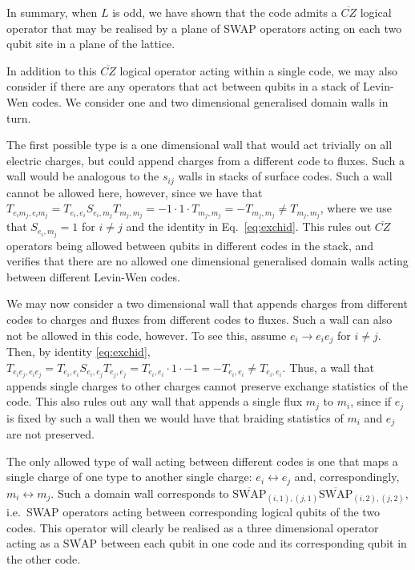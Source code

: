 \documentclass[pra,twocolumn,a4paper,nofootinbib]{revtex4-1}
\begin{document}
In summary, when $L$ is odd, we have shown that the code admits a $\overline{CZ}$ logical operator that may be realised by a plane of SWAP operators acting on each two qubit site in a plane of the lattice. 

In addition to this $\overline{CZ}$ logical operator acting within a single code, we may also consider if there are any operators that act between qubits in a stack of Levin-Wen codes. We consider one and two dimensional generalised domain walls in turn.

The first possible type is a one dimensional wall that would act trivially on all electric charges, but could append charges from a different code to fluxes. Such a wall would be analogous to the $s_{ij}$ walls in stacks of surface codes. Such a wall cannot be allowed here, however, since we have that $T_{e_im_j,e_im_j}= T_{e_i,e_i}S_{e_i,m_j}T_{m_j,m_j}=-1 \cdot 1 \cdot T_{m_j,m_j}=-T_{m_j,m_j} \neq T_{m_j,m_j}$, where we use that $S_{e_i,m_j}=1$ for $i\neq j$ and the identity in Eq.~\ref{eq:exchid}. This rules out $\overline{CZ}$ operators being allowed between qubits in different codes in the stack, and verifies that there are no allowed one dimensional generalised domain walls acting between different Levin-Wen codes.

We may now consider a two dimensional wall that appends charges from different codes to charges and fluxes from different codes to fluxes. Such a wall can also not be allowed in this code, however. To see this, assume $e_i \to e_ie_j$ for $i \neq j$. Then, by identity \ref{eq:exchid}, $T_{e_ie_j,e_ie_j}=T_{e_i,e_i}S_{e_i,e_j}T_{e_j,e_j}=T_{e_i,e_i} \cdot 1 \cdot -1=-T_{e_i,e_i}\neq T_{e_i,e_i}$. Thus, a wall that appends single charges to other charges cannot preserve exchange statistics of the code. This also rules out any wall that appends a single flux $m_j$ to $m_i$, since if $e_j$ is fixed by such a wall then we would have that braiding statistics of $m_i$ and $e_j$ are not preserved.

The only allowed type of wall acting between different codes is one that maps a single charge of one type to another single charge: $e_i \leftrightarrow e_j$ and, correspondingly, $m_i \leftrightarrow m_j$. Such a domain wall corresponds to $\overline{\text{SWAP}}_{(i,1),(j,1)}\overline{\text{SWAP}}_{(i,2),(j,2)}$, i.e.~SWAP operators acting between corresponding logical qubits of the two codes. This operator will clearly be realised as a three dimensional operator acting as a $\overline{\text{SWAP}}$ between each qubit in one code and its corresponding qubit in the other code.
\end{document}
